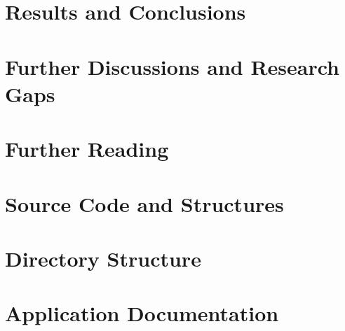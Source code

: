 \documentclass[11pt,twoside]{report}
\begin{document}
\chapter{Results and Conclusions}
\label{chap:results}

\chapter{Further Discussions and Research Gaps}
\label{chap:discussion}

\appendix
\chapter{Further Reading}
\label{apx:furtherreading}
\chapter{Source Code and Structures}
\label{apx:sourcecode}
\chapter{Directory Structure}
\label{apx:dirstruct}
\chapter{Application Documentation}
\label{apx:docs}



\end{document}
